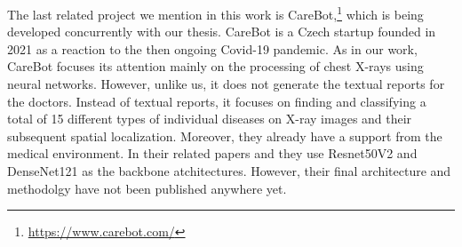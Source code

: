 The last related project we mention in this work is CareBot,\footnote[15]{\url{https://www.carebot.com/}} which is being developed concurrently with our thesis. CareBot is a Czech startup founded in 2021 as a reaction to the then ongoing Covid-19 pandemic. As in our work, CareBot focuses its attention mainly on the processing of chest X-rays using neural networks. However, unlike us, it does not generate the textual reports for the doctors. Instead of textual reports, it focuses on finding and classifying a total of 15 different types of individual diseases on X-ray images and their subsequent spatial localization. Moreover, they already have a support from the medical environment. In their related papers \citep{kvak2022towards} and \citep{kvak2021carebot} they use Resnet50V2 and DenseNet121 as the backbone atchitectures. However, their final architecture and methodolgy have not been published anywhere yet.











